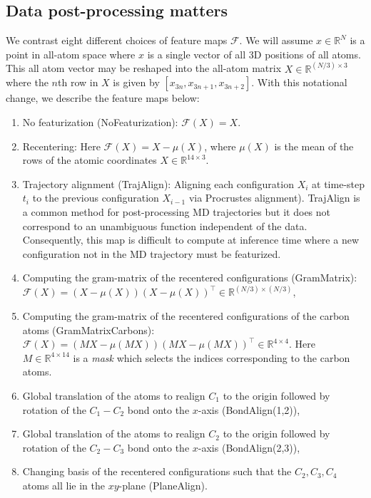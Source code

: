\documentclass[reqno, 12pt]{article}
\begin{document}
\subsection{Data post-processing matters} \label{subec: group invariant features}
We contrast eight different choices of feature maps $\mathcal{F}$. We will assume $x \in \mathbb{R}^{N}$ is a point in all-atom space where $x$ is a single vector of all 3D positions of all atoms. This all atom vector may be reshaped into the all-atom matrix $X \in \mathbb{R}^{(N/3) \times 3}$ where the $n$th row in $X$ is given by $[x_{3n}, x_{3n+1}, x_{3n+2}]$. With this notational change, we describe the feature maps below: 
\begin{enumerate}
\item No featurization ({\sf NoFeaturization}): $\mathcal{F}(X) = X$. 
\item {\sf Recentering}: Here $\mathcal{F}(X) = X - \mu(X)$, where $\mu(X)$ is the mean of the rows of the atomic coordinates $X \in \mathbb{R}^{14 \times 3}$.
    \item Trajectory alignment ({\sf TrajAlign}): Aligning each configuration $X_i$ at time-step $t_i$ to the previous configuration $X_{i-1}$ via Procrustes alignment). {\sf TrajAlign} is a common method for post-processing MD trajectories but it does not correspond to an unambiguous function independent of the data. Consequently, this map is difficult to compute at inference time where a new configuration not in the MD trajectory must be featurized. 
    \item Computing the gram-matrix of the recentered configurations ({\sf GramMatrix}): $\mathcal{F}(X) = (X - \mu(X))(X-\mu(X))^{\top} \in \mathbb{R}^{(N/3) \times (N/3)}$,
    \item Computing the gram-matrix of the recentered configurations of the carbon atoms ({\sf GramMatrixCarbons}): $\mathcal{F}(X) = (MX - \mu(MX))(MX-\mu(MX))^{\top} \in \mathbb{R}^{4 \times 4}$. Here $M \in \mathbb{R}^{4 \times 14}$ is a \emph{mask} which selects the indices corresponding to the carbon atoms. 
    \item Global translation of the atoms to realign $C_1$ to the origin followed by rotation of the $C_1-C_2$ bond onto the $x$-axis ({\sf BondAlign(1,2)}), 
    \item Global translation of the atoms to realign $C_2$ to the origin followed by rotation of the $C_2-C_3$ bond onto the $x$-axis ({\sf BondAlign(2,3)}),
    \item Changing basis of the recentered configurations such that the $C_2, C_3, C_4$ atoms all lie in the $xy$-plane ({\sf  PlaneAlign}). 
\end{enumerate}
\end{document}
